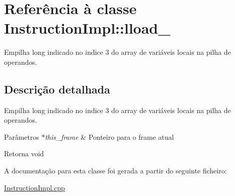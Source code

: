 \hypertarget{class_instruction_impl_1_1lload__3}{}\section{Referência à classe Instruction\+Impl\+:\+:lload\+\_}
\label{class_instruction_impl_1_1lload__3}


Empilha long indicado no indice 3 do array de variáveis locais na pilha de operandos.  




\subsection{Descrição detalhada}
Empilha long indicado no indice 3 do array de variáveis locais na pilha de operandos. 


\begin{DoxyParams}{Parâmetros}
{\em $\ast$this\+\_\+frame} & Ponteiro para o frame atual \\
\hline
\end{DoxyParams}
\begin{DoxyReturn}{Retorna}
void 
\end{DoxyReturn}


A documentação para esta classe foi gerada a partir do seguinte ficheiro\+:\begin{DoxyCompactItemize}
\item 
\hyperlink{_instruction_impl_8cpp}{Instruction\+Impl.\+cpp}\end{DoxyCompactItemize}
